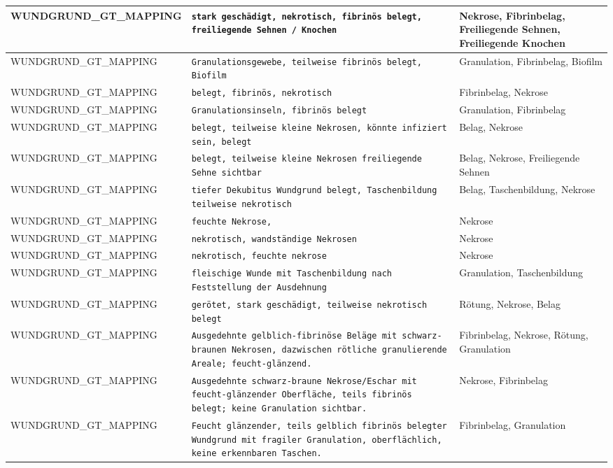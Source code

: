 \begin{longtable}{|p{3.5cm}|p{5cm}|p{6.5cm}|}
WUNDGRUND\_GT\_MAPPING & \texttt{stark geschädigt, nekrotisch, fibrinös belegt, freiliegende Sehnen / Knochen} & Nekrose, Fibrinbelag, Freiliegende Sehnen, Freiliegende Knochen \\ \hline
WUNDGRUND\_GT\_MAPPING & \texttt{Granulationsgewebe, teilweise fibrinös belegt, Biofilm} & Granulation, Fibrinbelag, Biofilm \\ \hline
WUNDGRUND\_GT\_MAPPING & \texttt{belegt, fibrinös, nekrotisch} & Fibrinbelag, Nekrose \\ \hline
WUNDGRUND\_GT\_MAPPING & \texttt{Granulationsinseln, fibrinös belegt} & Granulation, Fibrinbelag \\ \hline
WUNDGRUND\_GT\_MAPPING & \texttt{belegt, teilweise kleine Nekrosen, könnte infiziert sein, belegt} & Belag, Nekrose \\ \hline
WUNDGRUND\_GT\_MAPPING & \texttt{belegt, teilweise kleine Nekrosen freiliegende Sehne sichtbar} & Belag, Nekrose, Freiliegende Sehnen \\ \hline
WUNDGRUND\_GT\_MAPPING & \texttt{tiefer Dekubitus Wundgrund belegt, Taschenbildung teilweise nekrotisch} & Belag, Taschenbildung, Nekrose \\ \hline
WUNDGRUND\_GT\_MAPPING & \texttt{feuchte Nekrose,} & Nekrose \\ \hline
WUNDGRUND\_GT\_MAPPING & \texttt{nekrotisch, wandständige Nekrosen} & Nekrose \\ \hline
WUNDGRUND\_GT\_MAPPING & \texttt{nekrotisch, feuchte nekrose} & Nekrose \\ \hline
WUNDGRUND\_GT\_MAPPING & \texttt{fleischige Wunde mit Taschenbildung nach Feststellung der Ausdehnung} & Granulation, Taschenbildung \\ \hline
WUNDGRUND\_GT\_MAPPING & \texttt{gerötet, stark geschädigt, teilweise nekrotisch belegt} & Rötung, Nekrose, Belag \\ \hline
WUNDGRUND\_GT\_MAPPING & \texttt{Ausgedehnte gelblich-fibrinöse Beläge mit schwarz-braunen Nekrosen, dazwischen rötliche granulierende Areale; feucht-glänzend.} & Fibrinbelag, Nekrose, Rötung, Granulation \\ \hline
WUNDGRUND\_GT\_MAPPING & \texttt{Ausgedehnte schwarz-braune Nekrose/Eschar mit feucht-glänzender Oberfläche, teils fibrinös belegt; keine Granulation sichtbar.} & Nekrose, Fibrinbelag \\ \hline
WUNDGRUND\_GT\_MAPPING & \texttt{Feucht glänzender, teils gelblich fibrinös belegter Wundgrund mit fragiler Granulation, oberflächlich, keine erkennbaren Taschen.} & Fibrinbelag, Granulation \\ \hline

\end{longtable}
